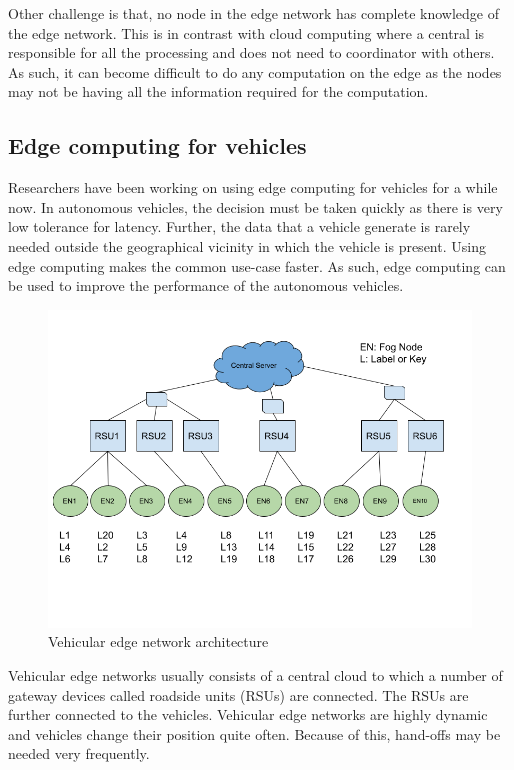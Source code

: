 Other challenge is that, no node in the edge network has complete knowledge of
the edge network. This is in contrast with cloud computing where a central is
responsible for all the processing and does not need to coordinator with others.
As such, it can become difficult to do any computation on the edge as the nodes
may not be having all the information required for the computation.

\subsection{Edge computing for vehicles}

Researchers have been working on using edge computing for vehicles for a while
now. In autonomous vehicles, the decision must be taken quickly as there is very
low tolerance for latency. Further, the data that a vehicle generate is rarely
needed outside the geographical vicinity in which the vehicle is present. Using
edge computing makes the common use-case faster. As such, edge computing can be
used to improve the performance of the autonomous vehicles.

\begin{figure}[h]
      \centering
      \includegraphics[width=1.0\textwidth]{"Vehicular Edge Network.png"}
      \caption{Vehicular edge network architecture}
\end{figure}

Vehicular edge networks usually consists of a central cloud to which a number of
gateway devices called roadside units (RSUs) are connected. The RSUs are further
connected to the vehicles. Vehicular edge networks are highly dynamic and
vehicles change their position quite often. Because of this, hand-offs may be
needed very frequently.

